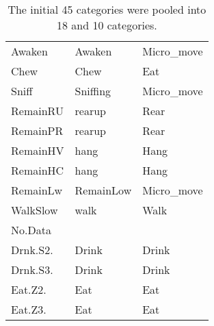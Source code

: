 \begin{table}[!htbp]
\begin{tabular}{|l|l|l|}
  Awaken & Awaken & Micro\_move \\ 
  Chew & Chew & Eat \\ 
  Sniff & Sniffing & Micro\_move \\ 
  RemainRU & rearup & Rear \\ 
  RemainPR & rearup & Rear \\ 
  RemainHV & hang & Hang \\ 
  RemainHC & hang & Hang \\ 
  RemainLw & RemainLow & Micro\_move \\ 
  WalkSlow & walk & Walk \\ 
  No.Data &  &  \\ 
  Drnk.S2. & Drink & Drink \\ 
  Drnk.S3. & Drink & Drink \\ 
  Eat.Z2. & Eat & Eat \\ 
  Eat.Z3. & Eat & Eat \\ 
   \hline
\end{tabular}
\caption{The initial 45 categories were pooled into 18 and 10 categories.} 
\label{cat_table}
\end{table}
